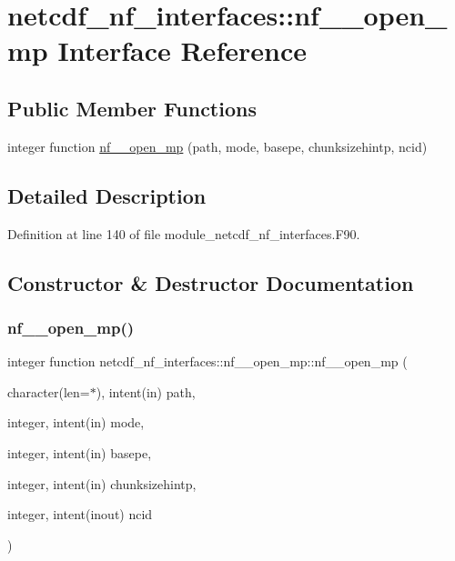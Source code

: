 \hypertarget{interfacenetcdf__nf__interfaces_1_1nf____open__mp}{}\section{netcdf\+\_\+nf\+\_\+interfaces\+:\+:nf\+\_\+\+\_\+open\+\_\+mp Interface Reference}
\label{interfacenetcdf__nf__interfaces_1_1nf____open__mp}
\subsection*{Public Member Functions}
\begin{DoxyCompactItemize}
\item 
integer function \hyperlink{interfacenetcdf__nf__interfaces_1_1nf____open__mp_a7569e6040b210c77f575c126d8927efe}{nf\+\_\+\+\_\+open\+\_\+mp} (path, mode, basepe, chunksizehintp, ncid)
\end{DoxyCompactItemize}


\subsection{Detailed Description}


Definition at line 140 of file module\+\_\+netcdf\+\_\+nf\+\_\+interfaces.\+F90.



\subsection{Constructor \& Destructor Documentation}
\mbox{\label{interfacenetcdf__nf__interfaces_1_1nf____open__mp_a7569e6040b210c77f575c126d8927efe}} 
\subsubsection{\texorpdfstring{nf\+\_\+\+\_\+open\+\_\+mp()}{nf\_\_open\_mp()}}
{\footnotesize\ttfamily integer function netcdf\+\_\+nf\+\_\+interfaces\+::nf\+\_\+\+\_\+open\+\_\+mp\+::nf\+\_\+\+\_\+open\+\_\+mp (\begin{DoxyParamCaption}\item[{character(len=$\ast$), intent(in)}]{path,  }\item[{integer, intent(in)}]{mode,  }\item[{integer, intent(in)}]{basepe,  }\item[{integer, intent(in)}]{chunksizehintp,  }\item[{integer, intent(inout)}]{ncid }\end{DoxyParamCaption})}



